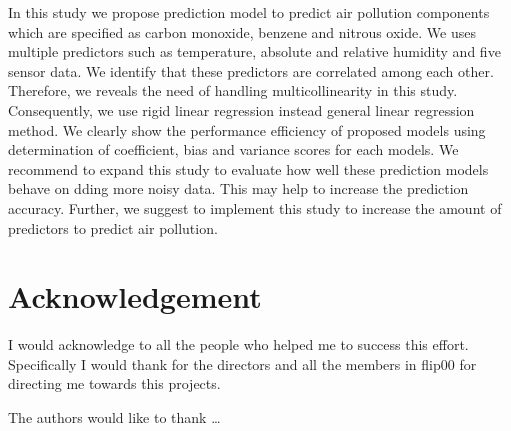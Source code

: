 In this study we propose prediction model to predict air pollution components which are specified as carbon monoxide, benzene and nitrous oxide. We uses multiple predictors such as temperature, absolute and relative humidity and five sensor data.
We identify that these predictors are correlated among each other.
Therefore, we reveals the need of handling multicollinearity in this study.
Consequently, we use rigid linear regression instead general linear regression method.
We clearly show the performance efficiency of proposed 
models using determination of coefficient, bias and variance scores for each models.
We recommend to expand this study to evaluate how well these prediction models behave on dding more noisy data.
This may help to increase the prediction accuracy.
Further, we suggest to implement this study to increase the amount of predictors to predict air pollution.

\section*{Acknowledgement}

I would acknowledge to all the people who helped me to success this effort. Specifically I would thank for the directors and all the members in flip00 for directing me towards this projects.


The authors would like to thank \ldots

